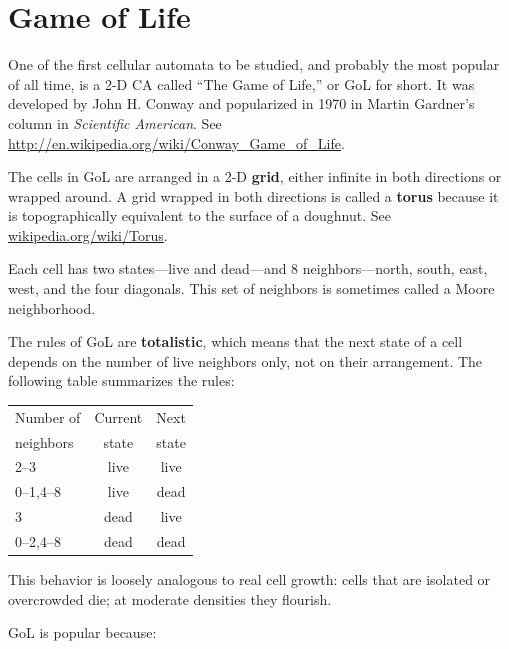 \documentclass[10pt]{book}
\begin{document}
\chapter{Game of Life}

One of the first cellular automata to be studied, and probably the
most popular of all time, is a 2-D CA called ``The Game of Life,'' or GoL
for short.  It was developed by John H. Conway and popularized in 1970
in Martin Gardner's column in {\em Scientific American}.
See \url{http://en.wikipedia.org/wiki/Conway_Game_of_Life}.

The cells in GoL are arranged in a 2-D {\bf grid}, 
either infinite in both
directions or wrapped around.  A grid wrapped
in both directions is called a {\bf torus} because it is topographically
equivalent to the surface of a doughnut.
See \url{wikipedia.org/wiki/Torus}.

Each cell has two states---live and dead---and 8 neighbors---north,
south, east, west, and the four diagonals.  This set of neighbors
is sometimes called a Moore neighborhood.

The rules of GoL are {\bf totalistic}, which means that the next
state of a cell depends on the number of live neighbors only, 
not on their arrangement.  The following table summarizes the
rules:

\begin{tabular}{|l|c|c|}
\hline
Number of     &   Current      & Next \\
neighbors     &   state        & state \\
\hline
2--3          &   live           & live         \\
0--1,4--8     &   live           & dead         \\
3             &   dead           & live         \\
0--2,4--8     &   dead           & dead         \\
\hline
\end{tabular}

This behavior is loosely analogous to real cell growth: cells
that are isolated or overcrowded die; at moderate densities they
flourish.

GoL is popular because:
\end{document}

